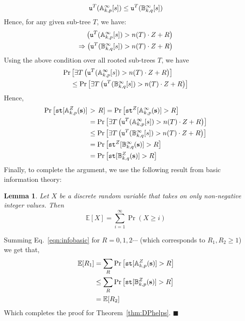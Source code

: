 \documentclass[USenglish,oneside,twocolumn]{article}
\newtheorem{lemma}{Lemma}
\begin{document}
$$
{\tt u}^T(\mathbb{A}^{\infty}_{k,p} [s]) \leq {\tt u}^T(\mathbb{B}^{\infty}_{k,q} [s])
$$
Hence, for any given sub-tree $T$, we have:
\begin{align*}
\left( {\tt u}^T(\mathbb{A}^{\infty}_{k,p} [s]) > n(T)\cdot Z + R \right) \\
\Rightarrow  \left( {\tt u}^T(\mathbb{B}^{\infty}_{k,q} [s]) > n(T)\cdot Z + R \right)
\end{align*}
Using the above condition over all rooted sub-trees $T$, we have
\begin{align*}
\Pr &\left[ \exists T \left( {\tt u}^T(\mathbb{A}^{\infty}_{k,p} [s]) > n(T)\cdot Z + R \right)  \right]  \\
&\leq \Pr \left[ \exists T \left( {\tt u}^T(\mathbb{B}^{\infty}_{k,q} [s]) > n(T)\cdot Z + R \right)  \right]
\end{align*}
Hence, 
\begin{align*}
\Pr \left[{\tt st} [\mathbb{A}_{k,p}^Z (\textbf{s}) ]\right. &> \left. R \right]  = \Pr \left[{\tt st}^Z [\mathbb{A}_{k,p}^{\infty} (\textbf{s}) ] > R \right]  \\
&= \Pr \left[ \exists T \left( {\tt u}^T(\mathbb{A}^{\infty}_{k,p} [s]) > n(T)\cdot Z + R \right)  \right]  \\
&\leq \Pr \left[ \exists T \left( {\tt u}^T(\mathbb{B}^{\infty}_{k,q} [s]) > n(T)\cdot Z + R \right)  \right] \\ 
&= \Pr \left[{\tt st}^Z [\mathbb{B}_{k,q}^{\infty} (\textbf{s}) ] > R \right]  \\
&= \Pr \left[{\tt st} [\mathbb{B}_{k,q}^Z (\textbf{s}) ] > R \right]  
\end{align*}
Finally, to complete the argument, we use the following result from basic information theory:
\begin{lemma}
Let $X$ be a discrete random variable that takes on only non-negative integer values. Then
\begin{equation} \label{eqn:infobasic}
\mathbb{E}[X] = \sum\limits_{i=1}^{\infty} \Pr(X \geq i)
\end{equation}
\end{lemma}
Summing Eq.~\ref{eqn:infobasic} for $R = 0, 1, 2 \cdots$ (which corresponds to $R_1, R_2 \geq 1$) we get that,
\begin{align*}
\mathbb{E} [R_1] &= \sum_R \Pr \left[{\tt st} [\mathbb{A}_{k,p}^Z (\textbf{s}) ] > R \right] \\
&\leq \sum_R \Pr \left[{\tt st} [\mathbb{B}_{k,p}^Z (\textbf{s}) ] > R \right] \\
&= \mathbb{E} [R_2] 
\end{align*}
Which completes the proof for Theorem~\ref{thm:DPhelps}. $\blacksquare $\\
\end{document}
